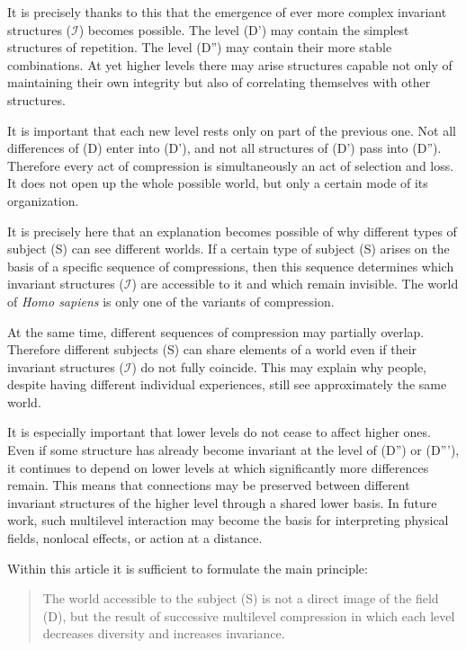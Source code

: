 \documentclass[aps,prd,onecolumn,nofootinbib,superscriptaddress]{revtex4-2} %
\begin{document}
    It is precisely thanks to this that the emergence of ever more complex invariant structures ($\mathcal{I}$) becomes possible. The level (D') may contain the simplest structures of repetition. The level (D'') may contain their more stable combinations. At yet higher levels there may arise structures capable not only of maintaining their own integrity but also of correlating themselves with other structures.

    It is important that each new level rests only on part of the previous one. Not all differences of (D) enter into (D'), and not all structures of (D') pass into (D''). Therefore every act of compression is simultaneously an act of selection and loss. It does not open up the whole possible world, but only a certain mode of its organization.

    It is precisely here that an explanation becomes possible of why different types of subject (S) can see different worlds. If a certain type of subject (S) arises on the basis of a specific sequence of compressions, then this sequence determines which invariant structures ($\mathcal{I}$) are accessible to it and which remain invisible. The world of \emph{Homo sapiens} is only one of the variants of compression.

    At the same time, different sequences of compression may partially overlap. Therefore different subjects (S) can share elements of a world even if their invariant structures ($\mathcal{I}$) do not fully coincide. This may explain why people, despite having different individual experiences, still see approximately the same world.

    It is especially important that lower levels do not cease to affect higher ones. Even if some structure has already become invariant at the level of (D'') or (D'''), it continues to depend on lower levels at which significantly more differences remain. This means that connections may be preserved between different invariant structures of the higher level through a shared lower basis. In future work, such multilevel interaction may become the basis for interpreting physical fields, nonlocal effects, or action at a distance.

    Within this article it is sufficient to formulate the main principle:

    \begin{quote}
        The world accessible to the subject (S) is not a direct image of the field (D), but the result of successive multilevel compression in which each level decreases diversity and increases invariance.
    \end{quote}
\end{document}
